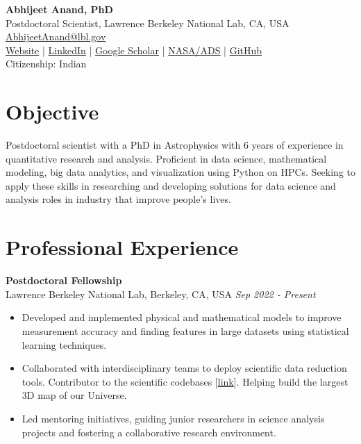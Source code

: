 \documentclass[a4paper,11pt]{article}
\begin{document}
\begin{center}
    {\LARGE \textbf{Abhijeet Anand, PhD}} \\
    Postdoctoral Scientist, Lawrence Berkeley National Lab, CA, USA \\
    \href{mailto:AbhijeetAnand@lbl.gov}{AbhijeetAnand@lbl.gov} \\
     \href{https://abhi0395.github.io/}{Website}  | \href{https://www.linkedin.com/in/abhijeet-anand-iisc}{LinkedIn} | \href{https://scholar.google.com/citations?hl=en&user=MfOuq1IAAAAJ}{Google Scholar} | \href{https://ui.adsabs.harvard.edu/public-libraries/YPXGQEsNQg-zR9R9YBYFXw}{NASA/ADS} | \href{https://github.com/abhi0395}{GitHub}\\
    Citizenship: Indian\\
\end{center}

\vspace{0.5cm}

\section*{Objective}
Postdoctoral scientist with a PhD in Astrophysics with 6 years of experience in quantitative research and analysis.
Proficient in data science, mathematical modeling, big data analytics, and visualization using Python on HPCs. Seeking to
apply these skills in researching and developing solutions for data science and analysis roles in industry that improve people's lives.

\section*{Professional Experience}
\noindent
\textbf{Postdoctoral Fellowship} \\
Lawrence Berkeley National Lab, Berkeley, CA, USA \hfill \textit{Sep 2022 - Present} \\
\begin{itemize}[noitemsep, topsep=0pt]
    \item Developed and implemented physical and mathematical models to improve measurement accuracy and finding features in large datasets using statistical learning techniques. 
     \item Collaborated with interdisciplinary teams to deploy scientific data reduction tools. Contributor to the scientific codebases [\href{https://github.com/desihub}{link}]. Helping build the largest 3D map of our Universe.
        \item Led mentoring initiatives, guiding junior researchers in science analysis projects and fostering a collaborative research environment.
\end{itemize}
\end{document}
